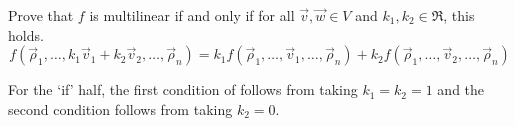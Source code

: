 \begin{exercises}
\begin{answer}
    \end{answer}
  \item 
     Prove that \( f \) is multilinear if and only if for all
     \( \vec{v},\vec{w}\in V \) and \( k_1,k_2\in\Re \), this holds.
      \begin{equation*}
         f(\vec{\rho}_1,\dots,k_1\vec{v}_1+k_2\vec{v}_2,
           \dots,\vec{\rho}_n)
         =
         k_1f(\vec{\rho}_1,\dots,\vec{v}_1,\dots,\vec{\rho}_n)+
         k_2f(\vec{\rho}_1,\dots,\vec{v}_2,\dots,\vec{\rho}_n)
       \end{equation*}
       \begin{answer}
         For the `if' half, the first condition of 
          follows from taking $k_1=k_2=1$
         and the second condition follows from taking $k_2=0$.


\end{answer}
\end{exercises}
